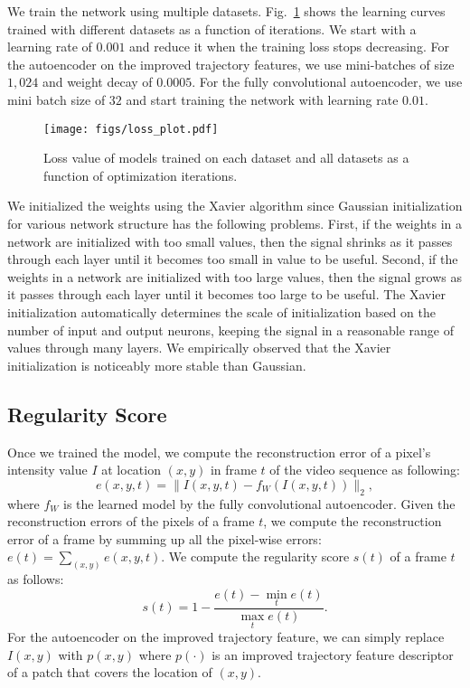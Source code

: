 \documentclass[10pt,twocolumn,letterpaper]{article}
\begin{document}
We train the network using multiple datasets.
Fig.~\ref{fig:loss_datasets} shows the learning curves trained with different datasets as a function of iterations.
We start with a learning rate of $0.001$ and reduce it when the training loss stops decreasing.
For the autoencoder on the improved trajectory features, we use mini-batches of size $1,024$ and weight decay of $0.0005$. 
For the fully convolutional autoencoder, we use mini batch size of $32$ and start training the network with learning rate $0.01$. 

\begin{figure}[h]
	\centering
		\texttt{[image: figs/loss\_plot.pdf]}
	\caption{Loss value of models trained on each dataset and all datasets as a function of optimization iterations.}
	\label{fig:loss_datasets}
	\vspace{-3mm}
\end{figure}


We initialized the weights using the Xavier algorithm \cite{glorot2010understanding} since Gaussian initialization for various network structure has the following problems.
First, if the weights in a network are initialized with too small values, then the signal shrinks as it passes through each layer until it becomes too small in value to be useful. 
Second, if the weights in a network are initialized with too large values, then the signal grows as it passes through each layer until it becomes too large to be useful.
The Xavier initialization automatically determines the scale of initialization based on the number of input and output neurons, keeping the signal in a reasonable range of values through many layers. 
We empirically observed that the Xavier initialization is noticeably more stable than Gaussian.


\subsection{Regularity Score}
Once we trained the model, we compute the reconstruction error of a pixel's intensity value $I$ at location $(x,y)$ in frame $t$ of the video sequence as following:
\begin{equation}
e(x,y,t) = \| I(x,y,t) - f_{W}(I(x,y,t)) \|_2,
\label{eq:test}
\end{equation}
where $f_W$ is the learned model by the fully convolutional autoencoder. Given the reconstruction errors of the pixels of a frame $t$, we compute the reconstruction error of a frame by summing up all the pixel-wise errors: $e(t) = \sum_{(x,y)} e(x,y,t)$. We compute the regularity score $s(t)$ of a frame $t$ as follows:
\begin{equation}
s(t) = 1 - \frac{e(t) - \min_t e(t)}{\max_t e(t)}.
\label{eq:test1}
\end{equation}
For the autoencoder on the improved trajectory feature, we can simply replace $I(x,y)$ with $p(x,y)$ where $p(\cdot)$ is an improved trajectory feature descriptor of a patch that covers the location of $(x,y)$.
 
\end{document}
